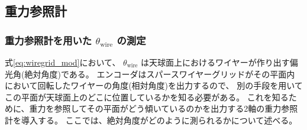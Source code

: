 \documentclass[../../main.tex]{subfiles}
\begin{document}
\subsection{重力参照計}
\label{subsec:wg_tiltsensor}
\subsubsection{重力参照計を用いた $\theta_{\mathrm{wire}}$ の測定}
式\eqref{eq:wiregrid_mod}において、 $\theta_{\mathrm{wire}}$ は天球面上におけるワイヤーが作り出す偏光角(絶対角度)である。
エンコーダはスパースワイヤーグリッドがその平面内において回転したワイヤーの角度(相対角度)を出力するので、
別の手段を用いてこの平面が天球面上のどこに位置しているかを知る必要がある。
これを知るために、重力を参照してその平面がどう傾いているのかを出力する2軸の重力参照計を導入する。
ここでは、絶対角度がどのように測られるかについて述べる。
\end{document}
